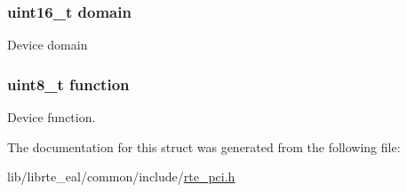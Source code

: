 \subsubsection[{domain}]{\setlength{\rightskip}{0pt plus 5cm}uint16\+\_\+t domain}\label{structrte__pci__addr_a71f5a95cafc58280f7afe1de6dfd98a2}
Device domain \hypertarget{structrte__pci__addr_a974c3822230d6402909c0b90969ae8eb}{}
\subsubsection[{function}]{\setlength{\rightskip}{0pt plus 5cm}uint8\+\_\+t function}\label{structrte__pci__addr_a974c3822230d6402909c0b90969ae8eb}
Device function. 

The documentation for this struct was generated from the following file\+:\begin{DoxyCompactItemize}
\item 
lib/librte\+\_\+eal/common/include/\hyperlink{rte__pci_8h}{rte\+\_\+pci.\+h}\end{DoxyCompactItemize}
